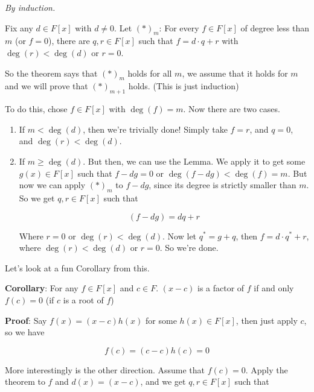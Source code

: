 \documentclass[12pt]{article}
\begin{document}
  {
    {\it By induction.}

    Fix any $d \in F[x]$ with $d \ne 0$. Let $(*)_m$: For every $f \in F[x]$ of
    degree less than $m$ (or $f = 0$), there are $q, r \in F[x]$ such that $f =
    d \cdot q + r$ with $\deg(r) < \deg(d)$ or $r = 0$.

    So the theorem says that $(*)_m$ holds for all $m$, we assume that it holds
    for $m$ and we will prove that $(*)_{m + 1}$ holds. (This is just induction)

    To do this, chose $f \in F[x]$ with $\deg(f) = m$. Now there are two cases.

    \begin{enumerate}
      \item If $m < \deg(d)$, then we're trivially done! Simply take $f = r$, and
        $q = 0$, and $\deg(r) < \deg(d)$.

      \item If $m \ge \deg(d)$. But then, we can use the Lemma. We apply it to
        get some $g(x) \in F[x]$ such that $f - dg = 0$ or $\deg(f - dg) <
        \deg(f) = m$. But now we can apply $(*)_m$ to $f - dg$, since its degree
        is strictly smaller than $m$. So we get $q, r \in F[x]$ such that

        \[
          (f - dg) = dq + r
        \]

        Where $r = 0$ or $\deg(r) < \deg(d)$. Now let $q^* = g + q$, then $f = d
        \cdot q^* + r$, where $\deg(r) < \deg(d)$ or $r = 0$. So we're done.
    \end{enumerate}
  }

  Let's look at a fun Corollary from this.

  {\bf Corollary}: For any $f \in F[x]$ and $c \in F$. $(x - c)$ is a factor of
  $f$ if and only $f(c) = 0$ (if $c$ is a root of $f$)

  {\bf Proof}:
  Say $f(x) = (x - c)h(x)$ for some $h(x) \in F[x]$, then just apply $c$, so we
  have

  \[
    f(c) = (c - c)h(c) = 0
  \]

  More interestingly is the other direction. Assume that $f(c) = 0$. Apply the
  theorem to $f$ and $d(x) = (x - c)$, and we get $q, r \in F[x]$ such that
\end{document}
